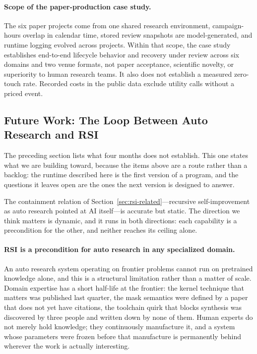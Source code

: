 \paragraph{Scope of the paper-production case study.}
The six paper projects come from one shared research environment, campaign-hours
overlap in calendar time, stored review snapshots are model-generated, and runtime
logging evolved across projects. Within that scope, the case study establishes
end-to-end lifecycle behavior and recovery under review across six domains and two
venue formats, not paper acceptance, scientific novelty, or superiority to human
research teams. It also does not establish a measured zero-touch rate. Recorded
costs in the public data exclude utility calls without a priced event.

\subsection{Future Work: The Loop Between Auto Research and RSI}

The preceding section lists what four months does not establish. This one states what
we are building toward, because the items above are a route rather than a backlog:
the runtime described here is the first version of a program, and the questions it
leaves open are the ones the next version is designed to answer.

The containment relation of Section~\ref{sec:rsi-related}---recursive
self-improvement as auto research pointed at AI itself---is accurate but static. The
direction we think matters is dynamic, and it runs in both directions: each capability
is a precondition for the other, and neither reaches its ceiling alone.

\paragraph{RSI is a precondition for auto research in any specialized domain.}
An auto research system operating on frontier problems cannot run on pretrained
knowledge alone, and this is a structural limitation rather than a matter of scale.
Domain expertise has a short half-life at the frontier: the kernel technique that
matters was published last quarter, the mask semantics were defined by a paper that
does not yet have citations, the toolchain quirk that blocks synthesis was discovered
by three people and written down by none of them. Human experts do not merely hold
knowledge; they continuously manufacture it, and a system whose parameters were
frozen before that manufacture is permanently behind wherever the work is actually
interesting.

